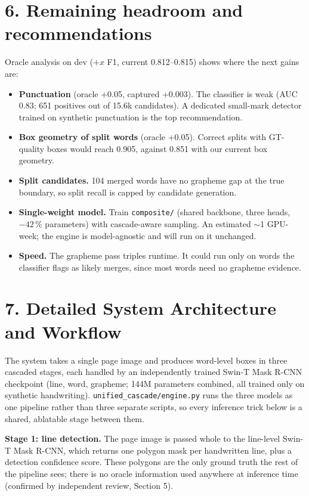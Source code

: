 \documentclass[10.5pt,a4paper]{article}
\begin{document}
\section*{6. Remaining headroom and recommendations}
Oracle analysis on dev ($+x$ F1, current 0.812--0.815) shows where the next gains are:
\begin{itemize}
  \item \textbf{Punctuation} (oracle +0.05, captured +0.003). The classifier is weak (AUC 0.83;
        651 positives out of 15.6k candidates). A dedicated small-mark detector trained on
        synthetic punctuation is the top recommendation.
  \item \textbf{Box geometry of split words} (oracle +0.05). Correct splits with GT-quality boxes
        would reach 0.905, against 0.851 with our current box geometry.
  \item \textbf{Split candidates.} 104 merged words have no grapheme gap at the true boundary, so
        split recall is capped by candidate generation.
  \item \textbf{Single-weight model.} Train \texttt{composite/} (shared backbone, three heads,
        $-42$\,\% parameters) with cascade-aware sampling. An estimated $\sim$1 GPU-week; the engine
        is model-agnostic and will run on it unchanged.
  \item \textbf{Speed.} The grapheme pass triples runtime. It could run only on words the
        classifier flags as likely merges, since most words need no grapheme evidence.
\end{itemize}

\newpage
\section*{7. Detailed System Architecture and Workflow}

The system takes a single page image and produces word-level boxes in three cascaded stages, each handled by an independently trained Swin-T Mask R-CNN checkpoint (line, word, grapheme; 144M parameters combined, all trained only on synthetic handwriting). \texttt{unified\_cascade/engine.py} runs the three models as one pipeline rather than three separate scripts, so every inference trick below is a shared, ablatable stage between them.

\textbf{Stage 1: line detection.} The page image is passed whole to the line-level Swin-T Mask R-CNN, which returns one polygon mask per handwritten line, plus a detection confidence score. These polygons are the only ground truth the rest of the pipeline sees; there is no oracle information used anywhere at inference time (confirmed by independent review, Section 5).
\end{document}

